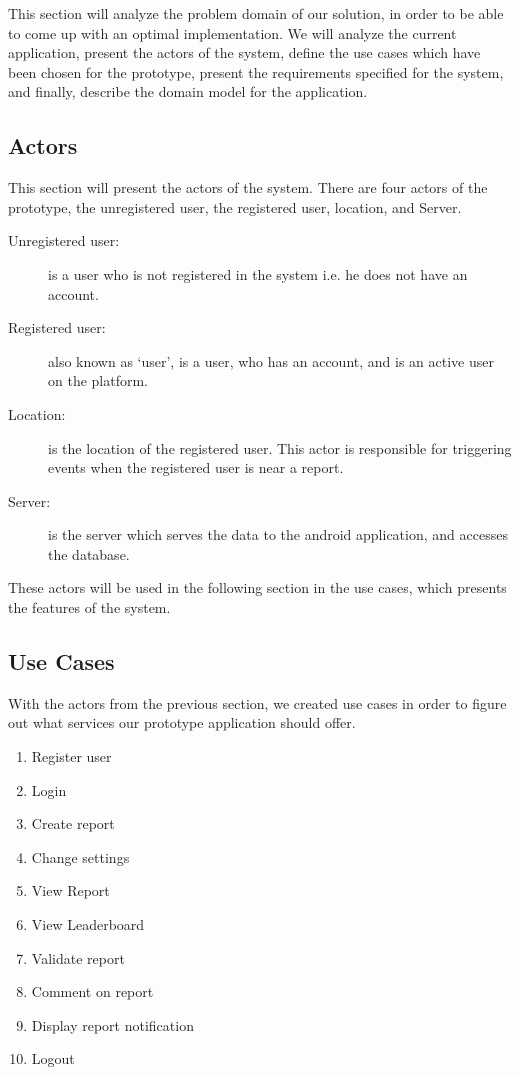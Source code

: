 
This section will analyze the problem domain of our solution, in order to be able to come up with an optimal implementation. We will analyze the current application, present the actors of the system, define the use cases which have been chosen for the prototype, present the requirements specified for the system, and finally, describe the domain model for the application.

%
\subsection{Actors}
This section will present the actors of the system. There are four actors of the prototype, the unregistered user, the registered user, location, and Server.

\begin{description}
\item [Unregistered user:] is a user who is not registered in the system i.e. he does not have an account.
\item [Registered user:] also known as ‘user’, is a user, who has an account, and is an active user on the platform.
\item [Location:] is the location of the registered user. This actor is responsible for triggering events when the registered user is near a report.
\item [Server:] is the server which serves the data to the android application, and accesses the database.
\end{description}
These actors will be used in the following section in the use cases, which presents the features of the system.


\subsection{Use Cases}
With the actors from the previous section, we created use cases in order to figure out what services our prototype application should offer.

\begin{enumerate}[label=UC\arabic*]
\item Register user
\item Login
\item Create report
\item Change settings
\item View Report
\item View Leaderboard
\item Validate report
\item Comment on report
\item Display report notification
\item Logout
\end{enumerate}

